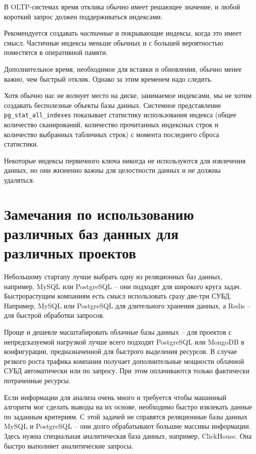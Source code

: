 \documentclass[%
	11pt,
	a4paper,
	utf8,
		]{article}
\begin{document}
В OLTP-системах время отклика обычно имеет решающее значение, и любой короткий запрос должен поддерживаться индексами.

Рекомендуется создавать \emph{частичные} и покрывающие индексы, когда это имеет смысл. Частичные индексы меньше обычных и с большей вероятностью поместятся в оперативной памяти.

Дополнительное время, необходимое для вставки и обновления, обычно менее важно, чем быстрый отклик. Однако за этим временем надо следить.

Хотя обычно нас не волнует место на диске, занимаемое индексами, мы не хотим создавать бесполезные объекты базы данных. Системное представление \verb|pg_stat_all_indexes| показывает статистику использования индекса (общее количество сканирований, количество прочитанных индексных строк и количество выбранных табличных строк) с момента последнего сброса статистики.

Некоторые индексы первичного ключа никогда не используются для извлечения данных, но они жизненно важны для целостности данных и не должны удаляться.





\section{Замечания по использованию различных баз данных для различных проектов}

Небольшому стартапу лучше выбрать одну из реляционных баз данных, например, MySQL или PostgreSQL -- они подходят для широкого круга задач. Быстрорастущим компаниям есть смысл использовать сразу две-три СУБД. Например, MySQL или PostgreSQL для длительного хранения данных, а Redis -- для быстрой обработки запросов.

Проще и дешевле масштабировать облачные базы данных -- для проектов с непредсказуемой нагрузкой лучше всего подходят PostgreSQL или MongoDB в конфигурации, предназначенной для быстрого выделения ресурсов. В случае резкого роста трафика компания получает дополнительные мощности облачной СУБД автоматически или по запросу. При этом оплачиваются только фактически потраченные ресурсы.

Если информации для анализа очень много и требуется чтобы машинный алгоритм мог сделать выводы на их основе, необходимо быстро извлекать данные по заданным критериям. С этой задачей не справятся реляционные базы данных MySQL и PostgreSQL -- они долго обрабатывают большие массивы информации. Здесь нужна специальная аналитическая база данных, например, ClickHouse. Она быстро выполняет аналитические запросы.
\end{document}
